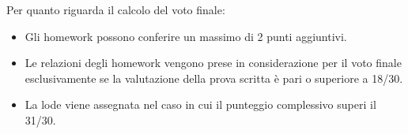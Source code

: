 Per quanto riguarda il calcolo del voto finale:
\begin{itemize}
    \item Gli homework possono conferire un massimo di 2 punti aggiuntivi.
    \item Le relazioni degli homework vengono prese in considerazione per il voto finale esclusivamente se la valutazione della prova scritta è pari o superiore a 18/30.
    \item La lode viene assegnata nel caso in cui il punteggio complessivo superi il 31/30.
\end{itemize}